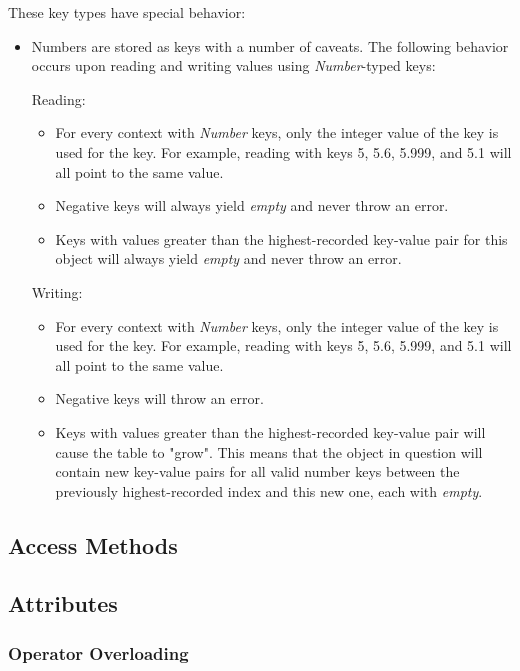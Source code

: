 \documentclass[12pt,letterpaper]{report}
\begin{document}
These key types have special behavior:


\begin{itemize}
  \item Numbers are stored as keys with a number of caveats. The following behavior occurs 
  upon reading and writing values using \textit{Number}-typed keys:
  
  Reading:
  \begin{itemize}
    \item For every context with \textit{Number} keys, only the integer value of the key is used for the key. For example, reading with keys 5, 5.6, 5.999, and 5.1 will all point to the same value.    
    \item Negative keys will always yield \textit{empty} and never throw an error.
    \item Keys with values greater than the highest-recorded key-value pair for this object will always yield \textit{empty} and never throw an error.      
  \end{itemize}

  Writing:
  \begin{itemize}
    \item For every context with \textit{Number} keys, only the integer value of the key is used for the key. For example, reading with keys 5, 5.6, 5.999, and 5.1 will all point to the same value.    
    \item Negative keys will throw an error.
    \item Keys with values greater than the highest-recorded key-value pair will cause the table to "grow". This means that the object in question will contain new key-value pairs for all valid number keys between the previously highest-recorded index and this new one, each with \textit{empty}.
  \end{itemize}
\end{itemize}


\subsection{Access Methods}\label{Access Methods}
  
\subsection{Attributes}\label{Attributes}
\subsubsection{Operator Overloading}\label{Operator Overloading}
\end{document}

